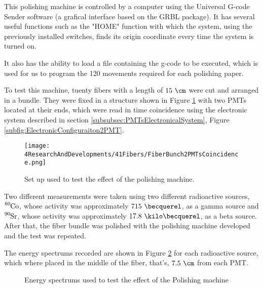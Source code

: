 This polishing machine is controlled by a computer using the Universal G-code Sender software (a grafical interface based on the GRBL package). It has several useful functions such as the "HOME" function with which the system, using the previously installed switches, finds its origin coordinate every time the system is turned on. 

It also has the ability to load a file containing the g-code to be executed, which is used for us to program the 120 movements required for each polishing paper.

To test this machine, tuenty fibers with a length of $15~\cm$ were cut and arranged in a bundle. They were fixed in a structure shown in Figure \ref{fig:BunchWith2PMTsCoincidence} with two PMTs located at their ends, which were read in time coincidence using the electronic system described in section \ref{subsubsec:PMTsElectronicalSystem}, Figure \ref{subfig:ElectronicConfiguraiton2PMT}.

\begin{figure}[]
\centering
\texttt{[image: 4ResearchAndDevelopments/41Fibers/FiberBunch2PMTsCoincidence.png]}
\caption{Set up used to test the effect of the polishing machine.\label{fig:BunchWith2PMTsCoincidence}}
\end{figure}

Two different measurements were taken using two different radioactive sources, $\ce{^{60}Co}$, whose activity was approximately $715~\becquerel$, as a gamma source and $\ce{^{90}Sr}$, whose activity was approximately $17.8~\kilo\becquerel$, as a beta source. After that, the fiber bundle was polished with the polishing machine developed and the test was repeated.

The energy spectrums recorded are shown in Figure \ref{fig:ResultsOfPolishingMachine} for each radioactive source, which where placed in the middle of the fiber, that's, $7.5~\cm$ from each PMT.

\begin{figure}[h]
 \centering
    \newline
 \caption{Energy spectrums used to test the effect of the Polishing machine}
 \label{fig:ResultsOfPolishingMachine}
\end{figure}

